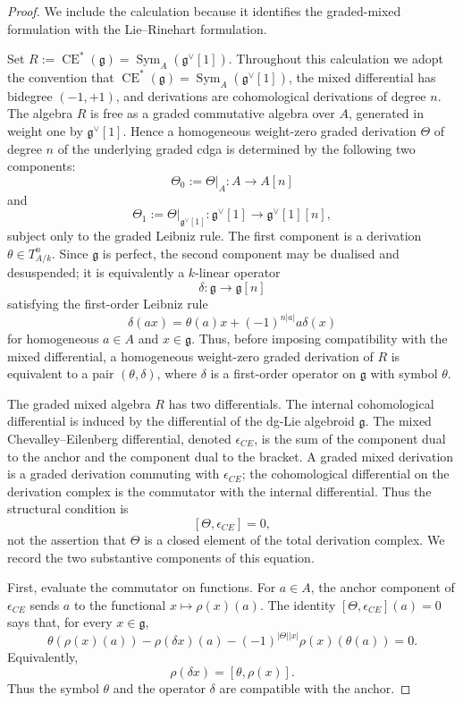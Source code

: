 \documentclass[10pt,a4paper]{amsart}
\DeclareMathOperator{\CE}{CE}
\DeclareMathOperator{\Sym}{Sym}
\newcommand{\from}{\colon}
\newcommand{\g}{\mathfrak g}
\newcommand{\kk}{k}
\begin{document}
\begin{proof}
We include the calculation because it identifies the graded-mixed formulation with the Lie--Rinehart formulation.

Set
 $
 R:=\CE^*(\g)=\Sym_A(\g^\vee[1]).
$
Throughout this calculation we adopt the convention that \(\CE^*(\g)=\Sym_A(\g^\vee[1])\), the mixed differential has bidegree \((-1,+1)\), and derivations are cohomological derivations of degree \(n\). The algebra \(R\) is free as a graded commutative algebra over \(A\), generated in weight one by \(\g^\vee[1]\). Hence a homogeneous weight-zero graded derivation \(\Theta\) of degree \(n\) of the underlying graded cdga is determined by the following two components:
\[
 \Theta_0:=\Theta|_A\from A\longrightarrow A[n]
\]
and
\[
 \Theta_1:=\Theta|_{\g^\vee[1]}\from
 \g^\vee[1]\longrightarrow \g^\vee[1][n],
\]
subject only to the graded Leibniz rule. The first component is a derivation \(\theta\in T_{A/\kk}^n\). Since \(\g\) is perfect, the second component may be dualised and desuspended; it is equivalently a \(\kk\)-linear operator
\[
 \delta\from\g\longrightarrow\g[n]
\]
satisfying the first-order Leibniz rule
\[
 \delta(ax)=\theta(a)x+(-1)^{n|a|}a\delta(x)
\]
for homogeneous \(a\in A\) and \(x\in\g\). Thus, before imposing compatibility with the mixed differential, a homogeneous weight-zero graded derivation of \(R\) is equivalent to a pair \((\theta,\delta)\), where \(\delta\) is a first-order operator on \(\g\) with symbol \(\theta\).

The graded mixed algebra \(R\) has two differentials. The internal cohomological differential is induced by the differential of the dg-Lie algebroid \(\g\). The mixed Chevalley--Eilenberg differential, denoted \(\epsilon_{CE}\), is the sum of the component dual to the anchor and the component dual to the bracket. A graded mixed derivation is a graded derivation commuting with \(\epsilon_{CE}\); the cohomological differential on the derivation complex is the commutator with the internal differential. Thus the structural condition is
\[
 [\Theta,\epsilon_{CE}]=0,
\]
not the assertion that \(\Theta\) is a closed element of the total derivation complex. We record the two substantive components of this equation.

First, evaluate the commutator on functions. For \(a\in A\), the anchor component of \(\epsilon_{CE}\) sends \(a\) to the functional \(x\mapsto \rho(x)(a)\). The identity \([\Theta,\epsilon_{CE}](a)=0\) says that, for every \(x\in\g\),
\[
 \theta(\rho(x)(a))-
\rho(\delta x)(a)-(-1)^{|\Theta||x|}\rho(x)(\theta(a))=0.
\]
Equivalently,
\[
 \rho(\delta x)=[\theta,\rho(x)] .
\]
Thus the symbol \(\theta\) and the operator \(\delta\) are compatible with the anchor.


\end{proof}
\end{document}
